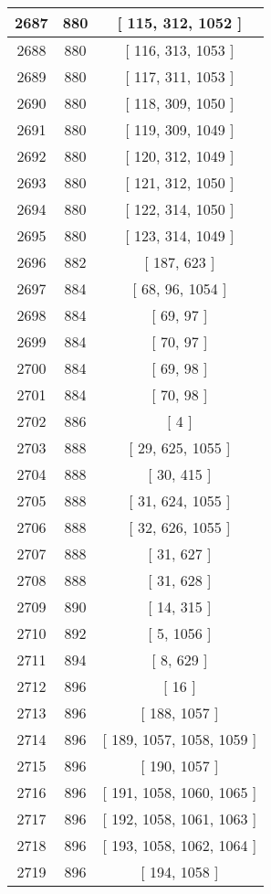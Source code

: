 \begin{center}
\begin{longtable}[H]{|| c c c ||}
\hline
2687 & 880 & [ 115, 312, 1052 ] \\ 
\hline
2688 & 880 & [ 116, 313, 1053 ] \\ 
\hline
2689 & 880 & [ 117, 311, 1053 ] \\ 
\hline
2690 & 880 & [ 118, 309, 1050 ] \\ 
\hline
2691 & 880 & [ 119, 309, 1049 ] \\ 
\hline
2692 & 880 & [ 120, 312, 1049 ] \\ 
\hline
2693 & 880 & [ 121, 312, 1050 ] \\ 
\hline
2694 & 880 & [ 122, 314, 1050 ] \\ 
\hline
2695 & 880 & [ 123, 314, 1049 ] \\ 
\hline
2696 & 882 & [ 187, 623 ] \\ 
\hline
2697 & 884 & [ 68, 96, 1054 ] \\ 
\hline
2698 & 884 & [ 69, 97 ] \\ 
\hline
2699 & 884 & [ 70, 97 ] \\ 
\hline
2700 & 884 & [ 69, 98 ] \\ 
\hline
2701 & 884 & [ 70, 98 ] \\ 
\hline
2702 & 886 & [ 4 ] \\ 
\hline
2703 & 888 & [ 29, 625, 1055 ] \\ 
\hline
2704 & 888 & [ 30, 415 ] \\ 
\hline
2705 & 888 & [ 31, 624, 1055 ] \\ 
\hline
2706 & 888 & [ 32, 626, 1055 ] \\ 
\hline
2707 & 888 & [ 31, 627 ] \\ 
\hline
2708 & 888 & [ 31, 628 ] \\ 
\hline
2709 & 890 & [ 14, 315 ] \\ 
\hline
2710 & 892 & [ 5, 1056 ] \\ 
\hline
2711 & 894 & [ 8, 629 ] \\ 
\hline
2712 & 896 & [ 16 ] \\ 
\hline
2713 & 896 & [ 188, 1057 ] \\ 
\hline
2714 & 896 & [ 189, 1057, 1058, 1059 ] \\ 
\hline
2715 & 896 & [ 190, 1057 ] \\ 
\hline
2716 & 896 & [ 191, 1058, 1060, 1065 ] \\ 
\hline
2717 & 896 & [ 192, 1058, 1061, 1063 ] \\ 
\hline
2718 & 896 & [ 193, 1058, 1062, 1064 ] \\ 
\hline
2719 & 896 & [ 194, 1058 ] \\ 

\end{longtable}
\end{center}

